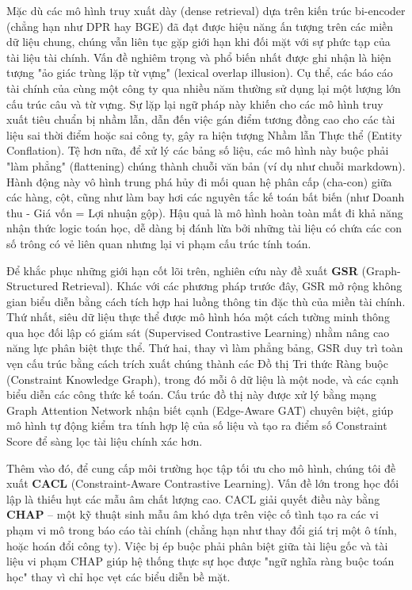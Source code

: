 \documentclass[10pt, a4paper]{article}
\begin{document}
Mặc dù các mô hình truy xuất dày (dense retrieval) dựa trên kiến trúc bi-encoder (chẳng hạn như DPR hay BGE) đã đạt được hiệu năng ấn tượng trên các miền dữ liệu chung, chúng vẫn liên tục gặp giới hạn khi đối mặt với sự phức tạp của tài liệu tài chính. Vấn đề nghiêm trọng và phổ biến nhất được ghi nhận là hiện tượng "ảo giác trùng lặp từ vựng" (lexical overlap illusion). Cụ thể, các báo cáo tài chính của cùng một công ty qua nhiều năm thường sử dụng lại một lượng lớn cấu trúc câu và từ vựng. Sự lặp lại ngữ pháp này khiến cho các mô hình truy xuất tiêu chuẩn bị nhầm lẫn, dẫn đến việc gán điểm tương đồng cao cho các tài liệu sai thời điểm hoặc sai công ty, gây ra hiện tượng Nhầm lẫn Thực thể (Entity Conflation). Tệ hơn nữa, để xử lý các bảng số liệu, các mô hình này buộc phải "làm phẳng" (flattening) chúng thành chuỗi văn bản (ví dụ như chuỗi markdown). Hành động này vô hình trung phá hủy đi mối quan hệ phân cấp (cha-con) giữa các hàng, cột, cũng như làm bay hơi các nguyên tắc kế toán bất biến (như Doanh thu - Giá vốn = Lợi nhuận gộp). Hậu quả là mô hình hoàn toàn mất đi khả năng nhận thức logic toán học, dễ dàng bị đánh lừa bởi những tài liệu có chứa các con số trông có vẻ liên quan nhưng lại vi phạm cấu trúc tính toán.

Để khắc phục những giới hạn cốt lõi trên, nghiên cứu này đề xuất \textbf{GSR} (Graph-Structured Retrieval). Khác với các phương pháp trước đây, GSR mở rộng không gian biểu diễn bằng cách tích hợp hai luồng thông tin đặc thù của miền tài chính. Thứ nhất, siêu dữ liệu thực thể được mô hình hóa một cách tường minh thông qua học đối lập có giám sát (Supervised Contrastive Learning) nhằm nâng cao năng lực phân biệt thực thể. Thứ hai, thay vì làm phẳng bảng, GSR duy trì toàn vẹn cấu trúc bằng cách trích xuất chúng thành các Đồ thị Tri thức Ràng buộc (Constraint Knowledge Graph), trong đó mỗi ô dữ liệu là một node, và các cạnh biểu diễn các công thức kế toán. Cấu trúc đồ thị này được xử lý bằng mạng Graph Attention Network nhận biết cạnh (Edge-Aware GAT) chuyên biệt, giúp mô hình tự động kiểm tra tính hợp lệ của số liệu và tạo ra điểm số Constraint Score để sàng lọc tài liệu chính xác hơn.

Thêm vào đó, để cung cấp môi trường học tập tối ưu cho mô hình, chúng tôi đề xuất \textbf{CACL} (Constraint-Aware Contrastive Learning). Vấn đề lớn trong học đối lập là thiếu hụt các mẫu âm chất lượng cao. CACL giải quyết điều này bằng \textbf{CHAP} -- một kỹ thuật sinh mẫu âm khó dựa trên việc cố tình tạo ra các vi phạm vi mô trong báo cáo tài chính (chẳng hạn như thay đổi giá trị một ô tính, hoặc hoán đổi công ty). Việc bị ép buộc phải phân biệt giữa tài liệu gốc và tài liệu vi phạm CHAP giúp hệ thống thực sự học được "ngữ nghĩa ràng buộc toán học" thay vì chỉ học vẹt các biểu diễn bề mặt.
\end{document}
